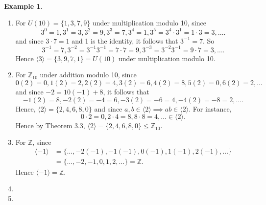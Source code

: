 \documentclass{article}
\theoremstyle{definition}
\newtheorem{example}{Example}[section]
\begin{document}
    \begin{example}
    \begin{enumerate}
        \item For $U(10)=\{1,3,7,9\}$ under multiplication modulo 10, since
        \begin{equation*}
            3^0=1, 3^1 = 3, 3^2 = 9, 3^3 = 7, 3^4 =1, 3^5=3^4\cdot3^1=1\cdot3=3, \dots.
        \end{equation*}
        and since $3\cdot7=1$ and 1 is the identity, it follows that $3^{-1}=7$. So
        \begin{equation*}
            3^{-1}=7, 3^{-2}=3^{-1}3^{-1}=7\cdot7=9, 3^{-3}=3^{-2}3^{-1}=9\cdot7=3, \dots.
        \end{equation*}
        Hence $\langle 3 \rangle = \{3,9,7,1\} = U(10)$ under multiplication modulo 10.
        
        \item For $\mathbb{Z}_{10}$ under addition modulo 10, since 
        \begin{equation*}
            0(2)=0, 1(2)=2, 2(2)=4, 3(2)=6, 4(2)=8, 5(2)=0, 6(2)=2, \dots
        \end{equation*}
        and since $-2=10(-1)+8$, it follows that
        \begin{equation*}
            -1(2)=8, -2(2)=-4=6, -3(2)=-6=4, -4(2)=-8=2, \dots.
        \end{equation*}
        Hence, $\langle 2 \rangle = \{2,4,6,8,0\}$ and since $a,b \in \langle 2 \rangle \implies ab \in \langle 2 \rangle$. For instance,
        \begin{equation*}
            0\cdot2  = 0, 2\cdot4 = 8, 8\cdot8 = 4, \dots \in \langle 2 \rangle.
        \end{equation*}
        Hence by Theorem 3.3, $\langle 2 \rangle = \{2,4,6,8,0\} \leq \mathbb{Z}_{10}$.
        
        \item For $\mathbb{Z}$, since
        \begin{align*}
            \langle -1 \rangle &= \{\dots,-2(-1),-1(-1),0(-1),1(-1),2(-1),\dots\} \\
            &= \{\dots, -2,-1,0,1,2,\dots\} = \mathbb{Z}.
        \end{align*}
        Hence $\langle -1 \rangle = \mathbb{Z}$.
        \item
        \item
    \end{enumerate}
    \end{example}
    
\end{document}

